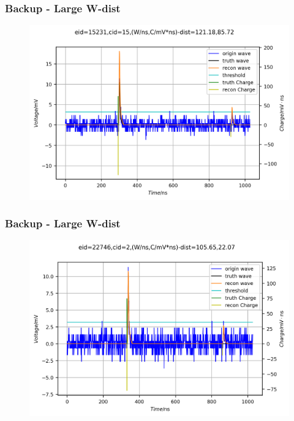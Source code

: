 \documentclass{beamer}
\begin{document}
\begin{frame}[noframenumbering]
\thispagestyle{empty}
\frametitle{Backup - Large W-dist}
\begin{figure}
    \centering
    \includegraphics[width=1.0\linewidth]{img/demoe15231c15.png}
\end{figure}
\end{frame}

\begin{frame}[noframenumbering]
\thispagestyle{empty}
\frametitle{Backup - Large W-dist}
\begin{figure}
    \centering
    \includegraphics[width=1.0\linewidth]{img/demoe22746c2.png}
\end{figure}
\end{frame}
\end{document}
